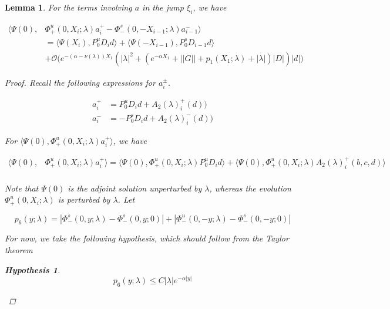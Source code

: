 \documentclass[12pt]{article}
\newtheorem{lemma}{Lemma}
\newtheorem{hypothesis}{Hypothesis}
\begin{document}
\begin{lemma}\label{jumpa}
For the terms involving $a$ in the jump $\xi_i$, we have

\begin{align*}
\langle \Psi(0), &\Phi^u_+(0, X_i; \lambda)a_i^+ - \Phi^s_-(0, -X_{i-1}; \lambda)a_{i-1}^- \rangle \\
&= \langle \Psi(X_i), P^u_0 D_i d \rangle + \langle \Psi(-X_{i-1}), P^s_0 D_{i-1} d \rangle \\
&+ \mathcal{O}\Big(e^{-(\alpha - \nu(\lambda)) X_1}(|\lambda|^2 
+ ( e^{-\alpha X_1} + ||G|| + p_1(X_1; \lambda) + |\lambda|)|D| )|d|\Big)
\end{align*}

\begin{proof}

Recall the following expressions for $a_i^\pm$.

\begin{align*}
a_i^+ &= P^u_0 D_i d + A_2(\lambda)_i^+(d))\\
a_i^- &= -P^s_0 D_i d + A_2(\lambda)_i^-(d))
\end{align*}

For $\langle \Psi(0), \Phi^u_+(0, X_i; \lambda)a_i^+ \rangle$, we have

\begin{align*}
\langle \Psi(0), &\Phi^u_+(0, X_i; \lambda) a_i^+ \rangle = \langle \Psi(0), \Phi^u_+(0, X_i; \lambda) P^u_0 D_i d \rangle + \langle \Psi(0), \Phi^u_+(0, X_i; \lambda) A_2(\lambda)_i^+(b, c, d) \rangle \\
\end{align*} 

Note that $\Psi(0)$ is the adjoint solution unperturbed by $\lambda$, whereas the evolution $\Phi^u_+(0, X_i; \lambda)$ is perturbed by $\lambda$. Let

\begin{equation}\label{p6}
p_6(y; \lambda) = |\Phi^s_-(0, y; \lambda) - \Phi^s_-(0, y; 0)| + |\Phi^u_-(0, -y; \lambda) - \Phi^s_-(0, -y; 0)| 
\end{equation}

For now, we take the following hypothesis, which should follow from the Taylor theorem

\begin{hypothesis}\label{p6}
\begin{equation}\label{p6bound}
p_6(y; \lambda) \leq C |\lambda| e^{-\alpha |y|}
\end{equation}
\end{hypothesis}


\end{proof}
\end{lemma}
\end{document}
